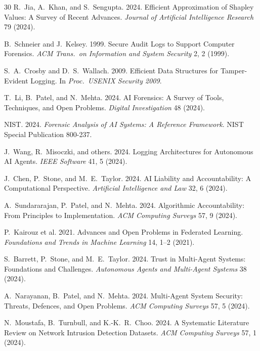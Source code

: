 \documentclass[sigconf,nonacm]{acmart}
\begin{document}
\begin{thebibliography}{30}
R.~Jia, A.~Khan, and S.~Sengupta. 2024. Efficient Approximation
of Shapley Values: A Survey of Recent Advances.
\textit{Journal of Artificial Intelligence Research} 79 (2024).

B.~Schneier and J.~Kelsey. 1999. Secure Audit Logs to Support
Computer Forensics. \textit{ACM Trans.\ on Information and
System Security} 2, 2 (1999).

S.~A.~Crosby and D.~S.~Wallach. 2009. Efficient Data Structures
for Tamper-Evident Logging. In \textit{Proc.\ USENIX Security 2009}.

T.~Li, B.~Patel, and N.~Mehta. 2024. AI Forensics: A Survey of
Tools, Techniques, and Open Problems. \textit{Digital Investigation}
48 (2024).

NIST. 2024. \textit{Forensic Analysis of AI Systems: A Reference
Framework}. NIST Special Publication 800-237.

J.~Wang, R.~Misoczki, and others. 2024. Logging Architectures for
Autonomous AI Agents. \textit{IEEE Software} 41, 5 (2024).

J.~Chen, P.~Stone, and M.~E.~Taylor. 2024. AI Liability and
Accountability: A Computational Perspective.
\textit{Artificial Intelligence and Law} 32, 6 (2024).

A.~Sundararajan, P.~Patel, and N.~Mehta. 2024. Algorithmic
Accountability: From Principles to Implementation.
\textit{ACM Computing Surveys} 57, 9 (2024).

P.~Kairouz et al. 2021. Advances and Open Problems in Federated
Learning. \textit{Foundations and Trends in Machine Learning} 14,
1--2 (2021).

S.~Barrett, P.~Stone, and M.~E.~Taylor. 2024. Trust in
Multi-Agent Systems: Foundations and Challenges.
\textit{Autonomous Agents and Multi-Agent Systems} 38 (2024).

A.~Narayanan, B.~Patel, and N.~Mehta. 2024. Multi-Agent System
Security: Threats, Defences, and Open Problems.
\textit{ACM Computing Surveys} 57, 5 (2024).

N.~Moustafa, B.~Turnbull, and K.-K.~R.~Choo. 2024. A Systematic
Literature Review on Network Intrusion Detection Datasets.
\textit{ACM Computing Surveys} 57, 1 (2024).


\end{thebibliography}
\end{document}
